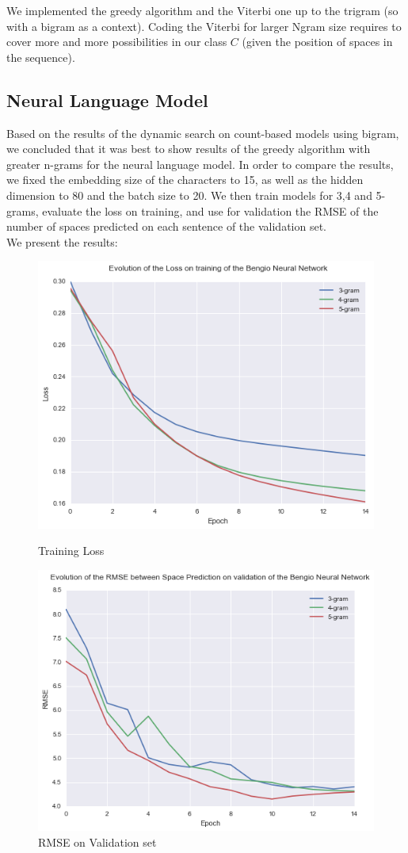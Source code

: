 \documentclass[11pt]{article}
\begin{document}
We implemented the greedy algorithm and the Viterbi one up to the trigram (so with a bigram as a context). Coding the Viterbi for larger Ngram size requires to cover more and more possibilities in our class $C$ (given the position of spaces in the sequence). 


\subsection{Neural Language Model}

Based on the results of the dynamic search on count-based models using bigram, we concluded that it was best to show results of the greedy algorithm with greater n-grams for the neural language model. In order to compare the results, we fixed the embedding size of the characters to 15, as well as the hidden dimension to 80 and the batch size to 20. We then train models for 3,4 and 5-grams, evaluate the loss on training, and use for validation the RMSE of the number of spaces predicted on each sentence of the validation set.\\

We present the results:

\begin{figure}[H]
\centering
\begin{minipage}{.5\textwidth}
  \centering
  \includegraphics[width=0.72\linewidth]{train_nn}
  \caption{Training Loss}
\end{minipage}%
\begin{minipage}{.5\textwidth}
  \centering
  \includegraphics[width=0.72\linewidth]{rmse}
  \caption{RMSE on Validation set}
\end{minipage}
\end{figure}
\end{document}
